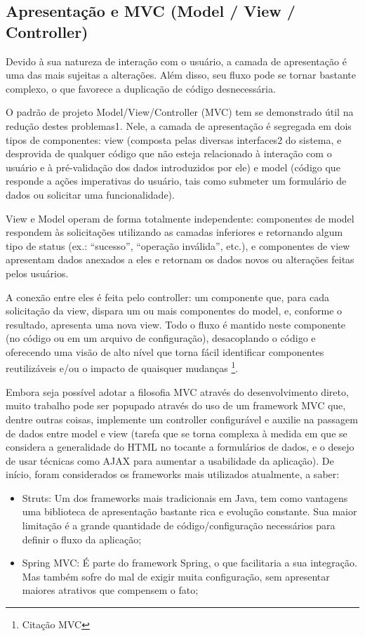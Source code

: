 \documentclass{abnt}
\begin{document}
\subsection{Apresentação e MVC (Model / View / Controller)}

Devido à sua natureza de interação com o usuário, a camada de apresentação é uma das mais sujeitas a alterações. Além disso, seu fluxo pode se tornar bastante complexo, o que favorece a duplicação de código desnecessária.

O padrão de projeto Model/View/Controller (MVC) tem se demonstrado útil na redução destes problemas1. Nele, a camada de apresentação é segregada em dois tipos de componentes: view (composta pelas diversas interfaces2 do sistema, e desprovida de qualquer código que não esteja relacionado à interação com o usuário e à pré-validação dos dados introduzidos por ele) e model (código que responde a ações imperativas do usuário, tais como submeter um formulário de dados ou solicitar uma funcionalidade).

View e Model operam de forma totalmente independente: componentes de model respondem às solicitações utilizando as camadas inferiores e retornando algum tipo de status (ex.: “sucesso”, “operação inválida”, etc.), e componentes de view apresentam dados anexados a eles e retornam os dados novos ou alterações feitas pelos usuários.

A conexão entre eles é feita pelo controller: um componente que, para cada solicitação da view, dispara um ou mais componentes do model, e, conforme o resultado, apresenta uma nova view. Todo o fluxo é mantido neste componente (no código ou em um arquivo de configuração), desacoplando o código e oferecendo uma visão de alto nível que torna fácil identificar componentes reutilizáveis e/ou o impacto de quaisquer mudanças \footnote{Citação MVC}.

Embora seja possível adotar a filosofia MVC através do desenvolvimento direto, muito trabalho pode ser popupado através do uso de um framework MVC que, dentre outras coisas, implemente um controller configurável e auxilie na passagem de dados entre model e view (tarefa que se torna complexa à medida em que se considera a generalidade do HTML no tocante a formulários de dados, e o desejo de usar técnicas como AJAX para aumentar a usabilidade da aplicação). De início, foram considerados os frameworks mais utilizados atualmente, a saber:

\begin{itemize}
\item Struts: Um dos frameworks mais tradicionais em Java, tem como vantagens uma biblioteca de apresentação bastante rica e evolução constante. Sua maior limitação é a grande quantidade de código/configuração necessários para definir o fluxo da aplicação;
\item Spring MVC: É parte do framework Spring, o que facilitaria a sua integração. Mas também sofre do mal de exigir muita configuração, sem apresentar maiores atrativos que compensem o fato;
\end{itemize}
\end{document}
